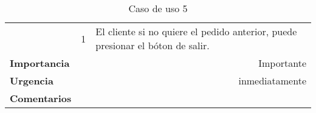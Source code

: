 \documentclass[conference]{IEEEtran}
\begin{document}
\begin{table}[H]
\begin{adjustbox}{width=0.47\textwidth}
\begin{tabular}{|p{11.215em}|r|r|}
\cmidrule{2-3}    \multicolumn{1}{|c|}{} & \multicolumn{1}{c|}{\multirow{2}[2]{*}{1}} & \multicolumn{1}{l|}{\multirow{2}[2]{*}{El cliente si no quiere el pedido anterior, puede presionar el bóton de salir.}} \\
    \multicolumn{1}{|c|}{} &       &  \\
    \midrule
    \textbf{Importancia} & \multicolumn{2}{p{37.355em}|}{Importante} \\
    \midrule
    \textbf{Urgencia} & \multicolumn{2}{p{37.355em}|}{inmediatamente} \\
    \midrule
    \textbf{Comentarios} & \multicolumn{2}{r|}{} \\
    \bottomrule
    \end{tabular}%
    \end{adjustbox}
    \vspace{0.3cm}
    \caption{Caso de uso 5}
  \label{tab:addlabel}%
\end{table}%
\end{document}
